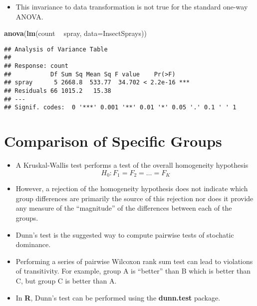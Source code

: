 \documentclass[]{book}
\newenvironment{Shaded}{\begin{snugshade}}{\end{snugshade}}
\newcommand{\DataTypeTok}[1]{\textcolor[rgb]{0.13,0.29,0.53}{#1}}
\newcommand{\KeywordTok}[1]{\textcolor[rgb]{0.13,0.29,0.53}{\textbf{#1}}}
\newcommand{\NormalTok}[1]{#1}
\newcommand{\OperatorTok}[1]{\textcolor[rgb]{0.81,0.36,0.00}{\textbf{#1}}}
\newcommand{\StringTok}[1]{\textcolor[rgb]{0.31,0.60,0.02}{#1}}
\providecommand{\tightlist}{%
  \setlength{\itemsep}{0pt}\setlength{\parskip}{0pt}}
\begin{document}
\begin{itemize}
\tightlist
\item
  This invariance to data transformation is not true for the standard one-way ANOVA.
\end{itemize}

\begin{Shaded}
\begin{Highlighting}[]
\KeywordTok{anova}\NormalTok{(}\KeywordTok{lm}\NormalTok{(count }\OperatorTok{~}\StringTok{ }\NormalTok{spray, }\DataTypeTok{data=}\NormalTok{InsectSprays))}
\end{Highlighting}
\end{Shaded}

\begin{verbatim}
## Analysis of Variance Table
## 
## Response: count
##           Df Sum Sq Mean Sq F value    Pr(>F)    
## spray      5 2668.8  533.77  34.702 < 2.2e-16 ***
## Residuals 66 1015.2   15.38                      
## ---
## Signif. codes:  0 '***' 0.001 '**' 0.01 '*' 0.05 '.' 0.1 ' ' 1
\end{verbatim}

\hypertarget{comparison-of-specific-groups}{%
\section{Comparison of Specific Groups}\label{comparison-of-specific-groups}}

\begin{itemize}
\item
  A Kruskal-Wallis test performs a test of the overall homogeneity hypothesis
  \begin{equation}
  H_{0}: F_{1} = F_{2} = \ldots = F_{K}
  \end{equation}
\item
  However, a rejection of the homogeneity hypothesis does not indicate which
  group differences are primarily the source of this rejection nor
  does it provide any measure of the ``magnitude'' of the differences between
  each of the groups.
\item
  Dunn's test is the suggested way to compute pairwise tests of stochatic dominance.
\item
  Performing a series of pairwise Wilcoxon rank sum test can
  lead to violations of transitivity. For example,
  group A is ``better'' than B which is better than C, but
  group C is better than A.
\item
  In \textbf{R}, Dunn's test can be performed using the \textbf{dunn.test} package.
\end{itemize}
\end{document}
